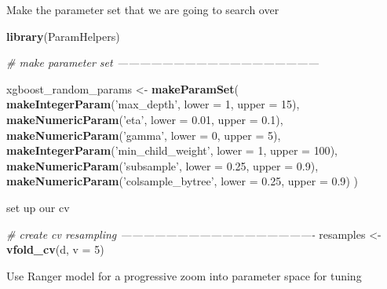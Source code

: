 \documentclass[]{book}
\newenvironment{Shaded}{\begin{snugshade}}{\end{snugshade}}
\newcommand{\KeywordTok}[1]{\textcolor[rgb]{0.13,0.29,0.53}{\textbf{#1}}}
\newcommand{\DataTypeTok}[1]{\textcolor[rgb]{0.13,0.29,0.53}{#1}}
\newcommand{\DecValTok}[1]{\textcolor[rgb]{0.00,0.00,0.81}{#1}}
\newcommand{\FloatTok}[1]{\textcolor[rgb]{0.00,0.00,0.81}{#1}}
\newcommand{\StringTok}[1]{\textcolor[rgb]{0.31,0.60,0.02}{#1}}
\newcommand{\CommentTok}[1]{\textcolor[rgb]{0.56,0.35,0.01}{\textit{#1}}}
\newcommand{\NormalTok}[1]{#1}
\theoremstyle{definition}
\theoremstyle{definition}
\theoremstyle{definition}
\theoremstyle{remark}
\begin{document}
Make the parameter set that we are going to search over

\begin{Shaded}
\begin{Highlighting}[]
\KeywordTok{library}\NormalTok{(ParamHelpers)}

\CommentTok{# make parameter set ------------------------------------------------------}

\NormalTok{xgboost_random_params <-}
\StringTok{  }\KeywordTok{makeParamSet}\NormalTok{(}
    \KeywordTok{makeIntegerParam}\NormalTok{(}\StringTok{'max_depth'}\NormalTok{, }\DataTypeTok{lower =} \DecValTok{1}\NormalTok{, }\DataTypeTok{upper =} \DecValTok{15}\NormalTok{),}
    \KeywordTok{makeNumericParam}\NormalTok{(}\StringTok{'eta'}\NormalTok{, }\DataTypeTok{lower =} \FloatTok{0.01}\NormalTok{, }\DataTypeTok{upper =} \FloatTok{0.1}\NormalTok{),}
    \KeywordTok{makeNumericParam}\NormalTok{(}\StringTok{'gamma'}\NormalTok{, }\DataTypeTok{lower =} \DecValTok{0}\NormalTok{, }\DataTypeTok{upper =} \DecValTok{5}\NormalTok{),}
    \KeywordTok{makeIntegerParam}\NormalTok{(}\StringTok{'min_child_weight'}\NormalTok{, }\DataTypeTok{lower =} \DecValTok{1}\NormalTok{, }\DataTypeTok{upper =} \DecValTok{100}\NormalTok{),}
    \KeywordTok{makeNumericParam}\NormalTok{(}\StringTok{'subsample'}\NormalTok{, }\DataTypeTok{lower =} \FloatTok{0.25}\NormalTok{, }\DataTypeTok{upper =} \FloatTok{0.9}\NormalTok{),}
    \KeywordTok{makeNumericParam}\NormalTok{(}\StringTok{'colsample_bytree'}\NormalTok{, }\DataTypeTok{lower =} \FloatTok{0.25}\NormalTok{, }\DataTypeTok{upper =} \FloatTok{0.9}\NormalTok{)}
\NormalTok{  )}
\end{Highlighting}
\end{Shaded}

set up our cv

\begin{Shaded}
\begin{Highlighting}[]
\CommentTok{# create cv resampling ----------------------------------------------------}
\NormalTok{resamples <-}\StringTok{ }\KeywordTok{vfold_cv}\NormalTok{(d, }\DataTypeTok{v =} \DecValTok{5}\NormalTok{) }
\end{Highlighting}
\end{Shaded}

Use Ranger model for a progressive zoom into parameter space for tuning
\end{document}

